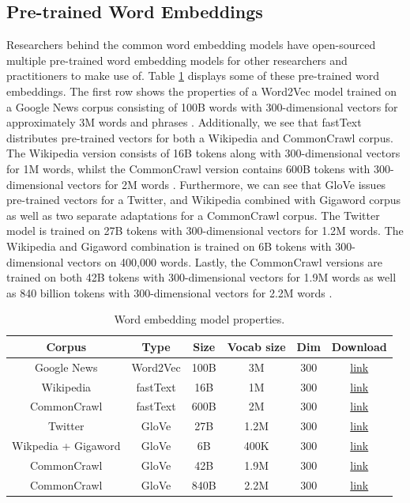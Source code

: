 \subsection{Pre-trained Word Embeddings}

Researchers behind the common word embedding models have open-sourced multiple pre-trained word embedding models for other researchers and practitioners to make use of. Table \ref{table:3} displays some of these pre-trained word embeddings. The first row shows the properties of a Word2Vec model trained on a Google News corpus consisting of 100B words with 300-dimensional vectors for approximately 3M words and phrases \citep{word2vec}. Additionally, we see that fastText distributes pre-trained vectors for both a Wikipedia and CommonCrawl corpus. The Wikipedia version consists of 16B tokens along with 300-dimensional vectors for 1M words, whilst the CommonCrawl version contains 600B tokens with 300-dimensional vectors for 2M words \citep{mikolov2018advances}. Furthermore, we can see that GloVe issues pre-trained vectors for a Twitter, and Wikipedia combined with Gigaword corpus as well as two separate adaptations for a CommonCrawl corpus. The Twitter model is trained on 27B tokens with 300-dimensional vectors for 1.2M words. The Wikipedia and Gigaword combination is trained on 6B tokens with 300-dimensional vectors on 400,000 words. Lastly, the CommonCrawl versions are trained on both 42B tokens with 300-dimensional vectors for 1.9M words as well as 840 billion tokens with 300-dimensional vectors for 2.2M words \citep{glove}. 

\begin{table}[h!]
\begin{center}
  \begin{tabular}{ |c|c|c|c|c|c| }
  \hline
    \textbf{Corpus} & \textbf{Type} & \textbf{Size} & \textbf{Vocab size} & \textbf{Dim} & \textbf{Download}  \\ 
  \hline
    Google News & Word2Vec & 100B & 3M & 300 & \href{https://code.google.com/archive/p/Word2Vec/}{link} \\  
    Wikipedia & fastText & 16B & 1M & 300 & \href{https://fasttext.cc/docs/en/english-vectors.html}{link} \\ 
    CommonCrawl & fastText & 600B & 2M & 300 & \href{https://fasttext.cc/docs/en/english-vectors.html}{link} \\ 
    Twitter & GloVe & 27B & 1.2M & 300 & \href{https://nlp.stanford.edu/projects/glove/}{link} \\
    Wikpedia + Gigaword & GloVe & 6B & 400K & 300 & \href{https://nlp.stanford.edu/projects/glove/}{link} \\
    CommonCrawl & GloVe & 42B & 1.9M & 300 & \href{https://nlp.stanford.edu/projects/glove/}{link} \\
    CommonCrawl & GloVe & 840B & 2.2M & 300 & \href{https://nlp.stanford.edu/projects/glove/}{link} \\
  \hline 
  \end{tabular}
  \caption{Word embedding model properties.}
  \label{table:3}
\end{center}
\end{table}

